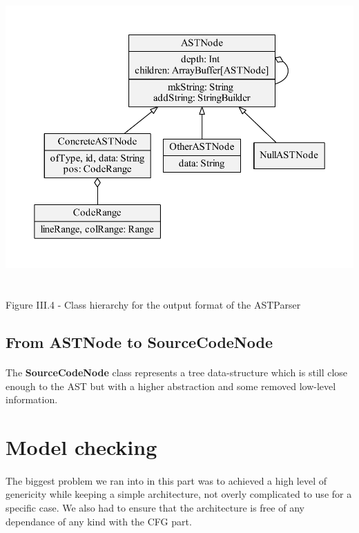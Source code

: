 \documentclass{report}
\begin{document}
\begin{center}
\includegraphics[scale=0.6]{data/AST_classes}
~\\~\\Figure III.4 - Class hierarchy for the output format of the ASTParser
\end{center}

\subsection{From ASTNode to SourceCodeNode}

\paragraph{}
\hspace{4mm}The \textbf{SourceCodeNode} class represents a tree data-structure
 which is still close enough to the AST but with a higher abstraction
 and some removed low-level information.

\section{Model checking}

\paragraph{}
\hspace{4mm}The biggest problem we ran into in this part was to achieved a high level of genericity while keeping
a simple architecture, not overly complicated to use for a specific case. We also had to ensure that the architecture is
free of any dependance of any kind with the CFG part.
\end{document}
